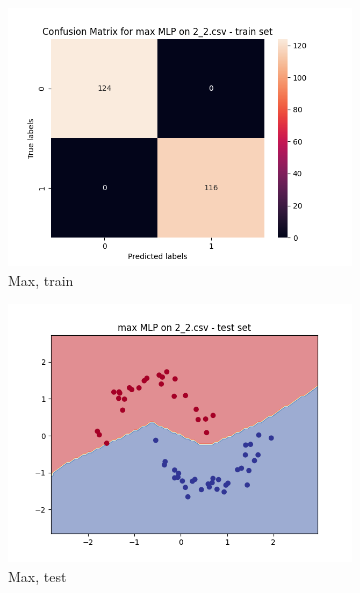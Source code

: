 \documentclass[12pt]{article}
\newcommand*{\subfigwidth}{0.24\textwidth}
\begin{document}
\begin{figure}[H]
\begin{subfigure}[t]{\subfigwidth}
        \includegraphics[width=\linewidth]{img/exp_2/mlp/2_2/max/train_matrix.png}
        \caption{Max, train}
    \end{subfigure}
    \hfill
    \begin{subfigure}[t]{\subfigwidth}
        \includegraphics[width=\linewidth]{img/exp_2/mlp/2_2/max/test_boundary.png}
        \caption{Max, test}
    \end{subfigure}
    \hfill
    \begin{subfigure}[t]{\subfigwidth}

\end{subfigure}
\end{figure}
\end{document}
